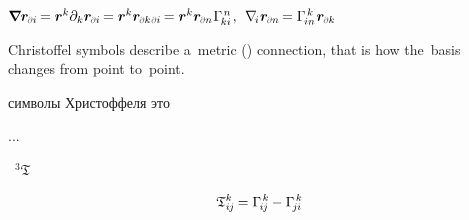 \begin{otherlanguage}{russian}
${
\boldnabla \locationvector_\differentialindex{i} \hspace{-0.2ex}
= \locationvector^k \partial_k \locationvector_\differentialindex{i} \hspace{-0.2ex}
= \locationvector^k \locationvector_{\differentialindex{k}\hspace{.2ex}\differentialindex{i}} \hspace{-0.2ex}
= \locationvector^k \locationvector_\differentialindex{n} \hspace{.1ex} \Gamma_{\hspace{-0.25ex}ki}^{\hspace{.25ex}n}
\hspace{.2ex} , \:\:
\nabla_{\hspace{-0.32ex}i\hspace{.1ex}} \locationvector_\differentialindex{n} \hspace{-0.25ex}
= \Gamma_{\hspace{-0.25ex}in}^{\hspace{.25ex}k} \hspace{.16ex} \locationvector_\differentialindex{k}
}$

\vspace{.2em}
Christoffel symbols describe a~metric () connection, that is how the~basis changes from point to~point.

символы Христоффеля это  

...

\href{https://en.wikipedia.org/wiki/Torsion_tensor}{}~${^3\bm{\mathfrak{T}}}$ 

\nopagebreak\vspace{-0.1em}\begin{equation*}
\mathfrak{T}^{k}_{i\hspace{-0.1ex}j} \hspace{-0.15ex} = \Gamma_{\hspace{-0.25ex}i\hspace{-0.1ex}j}^{\hspace{.25ex}k} \hspace{-0.1ex} - \Gamma_{\hspace{-0.33ex}j\hspace{-0.06ex}i}^{\hspace{.25ex}k}
\end{equation*}


\end{otherlanguage}
